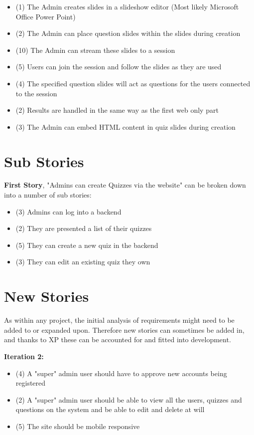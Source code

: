 \documentclass{article}
\begin{document}
\begin{itemize}
	\item (1) The Admin creates slides in a slideshow editor (Most likely Microsoft Office Power Point)
	\item (2) The Admin can place question slides within the slides during creation
	\item (10) The Admin can stream these slides to a session
	\item (5) Users can join the session and follow the slides as they are used	
	\item (4) The specified question slides will act as questions for the users connected to the session
	\item (2) Results are handled in the same way as the first web only part
	\item (3) The Admin can embed HTML content in quiz slides during creation
\end{itemize}
\newpage

\section{Sub Stories}
\textbf{First Story}, "Admins can create Quizzes via the website" can be broken down into a number of sub stories:
\begin{itemize}
	\item (3) Admins can log into a backend
	\item (2) They are presented a list of their quizzes
	\item (5) They can create a new quiz in the backend
	\item (3) They can edit an existing quiz they own
\end{itemize}

\section{New Stories}
As within any project, the initial analysis of requirements might need to be added to or expanded upon. Therefore new stories can sometimes be added in, and thanks to XP these can be accounted for and fitted into development.

\textbf{Iteration 2:}
\begin{itemize}
	\item (4) A "super" admin user should have to approve new accounts being registered
	\item (2) A "super" admin user should be able to view all the users, quizzes and questions on the system and be able to edit and delete at will
	\item (5) The site should be mobile responsive
\end{itemize}
\end{document}
